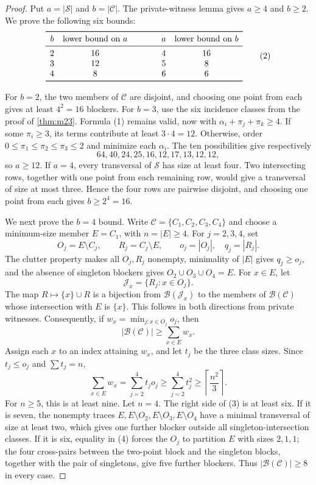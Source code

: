 \documentclass[a4paper,fleqn,longmktitle]{cas-sc}
\theoremstyle{definition}
\theoremstyle{remark}
\newcommand{\blocker}{\mathcal{B}}
\begin{document}
\begin{proof}
Put $a=|\mathcal S|$ and $b=|\mathcal C|$.  The private-witness lemma gives
$a\geq4$ and $b\geq2$.  We prove the following six bounds:
\[
\begin{array}{cc@{\qquad\qquad}cc}
\toprule
b&\text{lower bound on }a&a&\text{lower bound on }b\\
\midrule
2&16&4&16\\
3&12&5&8\\
4&8&6&6\\
\bottomrule
\end{array}
\tag{2}
\]

For $b=2$, the two members of $\mathcal C$ are disjoint, and choosing one
point from each gives at least $4^2=16$ blockers.  For $b=3$, use the six
incidence classes from the proof of \cref{thm:m23}.  Formula (1) remains
valid, now with
$\alpha_i+\pi_j+\pi_k\geq4$.  If some $\pi_i\geq3$, its terms contribute at
least $3\cdot4=12$.  Otherwise, order
$0\leq\pi_1\leq\pi_2\leq\pi_3\leq2$ and minimize each $\alpha_i$.
The ten possibilities give respectively
\[
  64,40,24,25,16,12,17,13,12,12,
\]
so $a\geq12$.  If $a=4$, every transversal of $\mathcal S$ has size at least
four.  Two intersecting rows, together with one point from each remaining
row, would give a transversal of size at most three.  Hence the four rows are
pairwise disjoint, and choosing one point from each gives $b\geq2^4=16$.

We next prove the $b=4$ bound.  Write
$\mathcal C=\{C_1,C_2,C_3,C_4\}$ and choose a minimum-size member
$E=C_1$, with $n=|E|\geq4$.  For $j=2,3,4$, set
\[
  O_j=E\setminus C_j,\qquad R_j=C_j\setminus E,\qquad
  o_j=|O_j|,\quad q_j=|R_j|.
\]
The clutter property makes all $O_j,R_j$ nonempty, minimality of $|E|$ gives
$q_j\geq o_j$, and the absence of singleton blockers gives
$O_2\cup O_3\cup O_4=E$.  For $x\in E$, let
\[
  \mathcal J_x=\{R_j:x\in O_j\}.
\]
The map $R\mapsto\{x\}\cup R$ is a bijection from
$\blocker(\mathcal J_x)$ to the members of $\blocker(\mathcal C)$ whose
intersection with $E$ is $\{x\}$.  This follows in both directions from
private witnesses.  Consequently, if
$w_x=\min_{j:x\in O_j}o_j$, then
\[
  |\blocker(\mathcal C)|\geq\sum_{x\in E}w_x.
\tag{3}
\]
Assign each $x$ to an index attaining $w_x$, and let $t_j$ be the three
class sizes.  Since $t_j\leq o_j$ and $\sum t_j=n$,
\[
  \sum_{x\in E}w_x=\sum_{j=2}^4t_j o_j
  \geq\sum_{j=2}^4t_j^2
  \geq\left\lceil\frac{n^2}{3}\right\rceil.
\tag{4}
\]
For $n\geq5$, this is at least nine.  Let $n=4$.  The right side of (3) is
at least six.  If it is seven, the nonempty traces
$E,E\setminus O_2,E\setminus O_3,E\setminus O_4$ have a minimal
transversal of size at least two, which gives one further blocker outside all
singleton-intersection classes.  If it is six, equality in (4) forces the
$O_j$ to partition $E$ with sizes $2,1,1$; the four cross-pairs between the
two-point block and the singleton blocks, together with the pair of
singletons, give five further blockers.  Thus
$|\blocker(\mathcal C)|\geq8$ in every case.


\end{proof}
\end{document}

